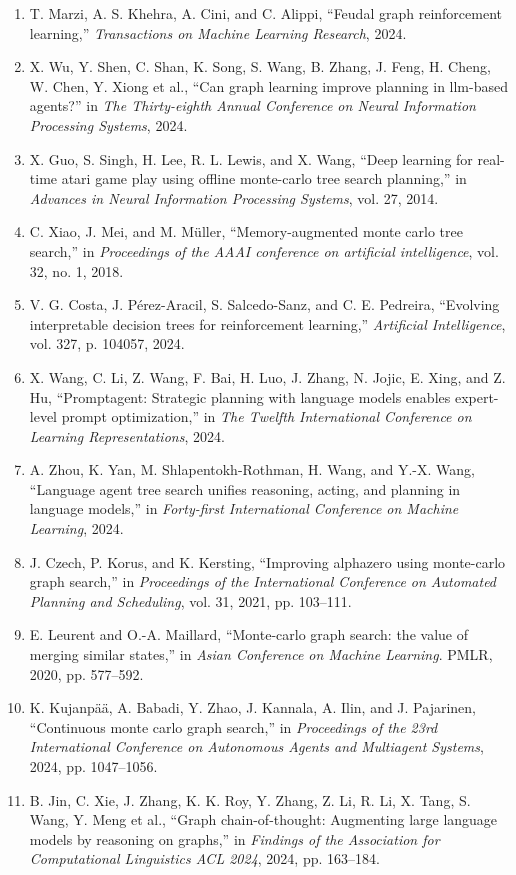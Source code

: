 \documentclass[10pt,UTF8,fontset=fandol]{ctexart}
\begin{document}
\begin{enumerate}[leftmargin=2.4em,labelsep=0.4em,itemsep=0.15em]
\item T. Marzi, A. S. Khehra, A. Cini, and C. Alippi, ``Feudal graph reinforcement learning,'' \textit{Transactions on Machine Learning Research}, 2024.
\item X. Wu, Y. Shen, C. Shan, K. Song, S. Wang, B. Zhang, J. Feng, H. Cheng, W. Chen, Y. Xiong et al., ``Can graph learning improve planning in llm-based agents?'' in \textit{The Thirty-eighth Annual Conference on Neural Information Processing Systems}, 2024.
\item X. Guo, S. Singh, H. Lee, R. L. Lewis, and X. Wang, ``Deep learning for real-time atari game play using offline monte-carlo tree search planning,'' in \textit{Advances in Neural Information Processing Systems}, vol. 27, 2014.
\item C. Xiao, J. Mei, and M. Müller, ``Memory-augmented monte carlo tree search,'' in \textit{Proceedings of the AAAI conference on artificial intelligence}, vol. 32, no. 1, 2018.
\item V. G. Costa, J. Pérez-Aracil, S. Salcedo-Sanz, and C. E. Pedreira, ``Evolving interpretable decision trees for reinforcement learning,'' \textit{Artificial Intelligence}, vol. 327, p. 104057, 2024.
\item X. Wang, C. Li, Z. Wang, F. Bai, H. Luo, J. Zhang, N. Jojic, E. Xing, and Z. Hu, ``Promptagent: Strategic planning with language models enables expert-level prompt optimization,'' in \textit{The Twelfth International Conference on Learning Representations}, 2024.
\item A. Zhou, K. Yan, M. Shlapentokh-Rothman, H. Wang, and Y.-X. Wang, ``Language agent tree search unifies reasoning, acting, and planning in language models,'' in \textit{Forty-first International Conference on Machine Learning}, 2024.
\item J. Czech, P. Korus, and K. Kersting, ``Improving alphazero using monte-carlo graph search,'' in \textit{Proceedings of the International Conference on Automated Planning and Scheduling}, vol. 31, 2021, pp. 103--111.
\item E. Leurent and O.-A. Maillard, ``Monte-carlo graph search: the value of merging similar states,'' in \textit{Asian Conference on Machine Learning}. PMLR, 2020, pp. 577--592.
\item K. Kujanpää, A. Babadi, Y. Zhao, J. Kannala, A. Ilin, and J. Pajarinen, ``Continuous monte carlo graph search,'' in \textit{Proceedings of the 23rd International Conference on Autonomous Agents and Multiagent Systems}, 2024, pp. 1047--1056.
\item B. Jin, C. Xie, J. Zhang, K. K. Roy, Y. Zhang, Z. Li, R. Li, X. Tang, S. Wang, Y. Meng et al., ``Graph chain-of-thought: Augmenting large language models by reasoning on graphs,'' in \textit{Findings of the Association for Computational Linguistics ACL 2024}, 2024, pp. 163--184.

\end{enumerate}
\end{document}
